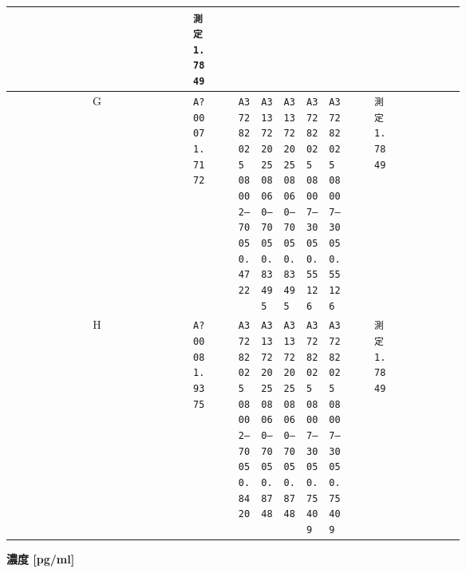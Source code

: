 \documentclass[UTF8,10pt,a4paper,fontset=fandol]{ctexart}
\begin{document}
\begin{center}
\begin{tabular}{c|*{12}{p{0.055\linewidth}|}}
 &
\texttt{測定\\1.7849} &
 &
 &
\\ \hline
G &
\texttt{A?0007\\1.7172} &
 &
\texttt{A37282025\\08002--7005\\0.4722} &
\texttt{A313722025\\08060--7005\\0.83495} &
\texttt{A313722025\\08060--7005\\0.83495} &
\texttt{A37282025\\08007--3005\\0.55126} &
\texttt{A37282025\\08007--3005\\0.55126} &
 &
\texttt{測定\\1.7849} &
 &
 &
\\ \hline
H &
\texttt{A?0008\\1.9375} &
 &
\texttt{A37282025\\08002--7005\\0.8420} &
\texttt{A313722025\\08060--7005\\0.8748} &
\texttt{A313722025\\08060--7005\\0.8748} &
\texttt{A37282025\\08007--3005\\0.75409} &
\texttt{A37282025\\08007--3005\\0.75409} &
 &
\texttt{測定\\1.7849} &
 &
 &
\\ \hline
\end{tabular}
\end{center}

\vspace{1em}

\noindent\textbf{濃度 [pg/ml]}
\end{document}
